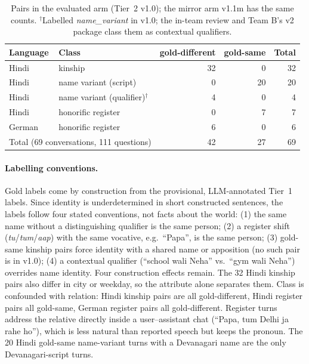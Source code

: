 \begin{table}[t]\centering\small
\begin{tabular}{llrrr}
\toprule
Language & Class & gold-different & gold-same & Total \\
\midrule
Hindi  & kinship                              & 32 & 0  & 32 \\
Hindi  & name variant (script)                & 0  & 20 & 20 \\
Hindi  & name variant (qualifier)$^\dagger$   & 4  & 0  & 4  \\
Hindi  & honorific register                   & 0  & 7  & 7  \\
German & honorific register                   & 6  & 0  & 6  \\
\midrule
\multicolumn{2}{l}{Total (69 conversations, 111 questions)} & 42 & 27 & 69 \\
\bottomrule
\end{tabular}
\caption{Pairs in the evaluated arm (Tier~2 v1.0); the mirror arm v1.1m has the same counts. $^\dagger$Labelled \emph{name\_variant} in
v1.0; the in-team review and Team B's v2 package class them as contextual qualifiers.}
\label{tab:benchmark}
\end{table}

\paragraph{Labelling conventions.} Gold labels come by construction from the provisional, LLM-annotated Tier~1 labels. Since identity is
underdetermined in short constructed sentences, the labels follow four stated conventions, not facts about the world: (1) the same name
without a distinguishing qualifier is the same person; (2) a register shift (\emph{tu}/\emph{tum}/\emph{aap}) with the same vocative,
e.g.\ ``Papa'', is the same person; (3) gold-same kinship pairs force identity with a shared name or apposition (no such pair is in v1.0);
(4) a contextual qualifier (``school wali Neha'' vs.\ ``gym wali Neha'') overrides name identity. Four construction effects remain. The
32 Hindi kinship pairs also differ in city or weekday, so the attribute alone separates them. Class is confounded with relation: Hindi
kinship pairs are all gold-different, Hindi register pairs all gold-same, German register pairs all gold-different. Register turns address
the relative directly inside a user--assistant chat (``Papa, tum Delhi ja rahe ho''), which is less natural than reported speech but keeps
the pronoun. The 20 Hindi gold-same name-variant turns with a Devanagari name are the only Devanagari-script turns.

